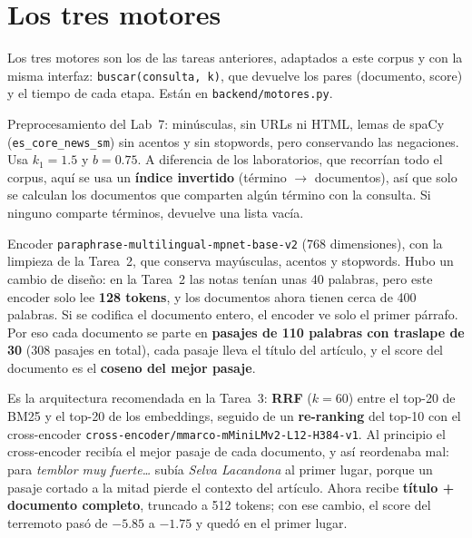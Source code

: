 \documentclass[11pt,letterpaper]{article}
\newcommand{\term}[1]{\texttt{#1}}
\begin{document}
\section{Los tres motores}

Los tres motores son los de las tareas anteriores, adaptados a este corpus y con la misma interfaz: \term{buscar(consulta, k)}, que devuelve los pares (documento, score) y el tiempo de cada etapa. Están en \term{backend/motores.py}.

\begin{description}[style=nextline]
\item[1. BM25 (Lab 3).] Preprocesamiento del Lab~7: minúsculas, sin URLs ni HTML, lemas de spaCy (\term{es\_core\_news\_sm}) sin acentos y sin stopwords, pero conservando las negaciones. Usa $k_1 = 1.5$ y $b = 0.75$. A diferencia de los laboratorios, que recorrían todo el corpus, aquí se usa un \textbf{índice invertido} (término $\to$ documentos), así que solo se calculan los documentos que comparten algún término con la consulta. Si ninguno comparte términos, devuelve una lista vacía.

\item[2. Embeddings (Tarea 2).] Encoder \term{paraphrase-multilingual-mpnet-base-v2} (768 dimensiones), con la limpieza de la Tarea~2, que conserva mayúsculas, acentos y stopwords. Hubo un cambio de diseño: en la Tarea~2 las notas tenían unas 40 palabras, pero este encoder solo lee \textbf{128 tokens}, y los documentos ahora tienen cerca de 400 palabras. Si se codifica el documento entero, el encoder ve solo el primer párrafo. Por eso cada documento se parte en \textbf{pasajes de 110 palabras con traslape de 30} (308 pasajes en total), cada pasaje lleva el título del artículo, y el score del documento es el \textbf{coseno del mejor pasaje}.

\item[3. Híbrido (Tarea 3).] Es la arquitectura recomendada en la Tarea~3: \textbf{RRF} ($k = 60$) entre el top-20 de BM25 y el top-20 de los embeddings, seguido de un \textbf{re-ranking} del top-10 con el cross-encoder \term{cross-encoder/mmarco-mMiniLMv2-L12-H384-v1}. Al principio el cross-encoder recibía el mejor pasaje de cada documento, y así reordenaba mal: para \emph{temblor muy fuerte\ldots} subía \emph{Selva Lacandona} al primer lugar, porque un pasaje cortado a la mitad pierde el contexto del artículo. Ahora recibe \textbf{título + documento completo}, truncado a 512 tokens; con ese cambio, el score del terremoto pasó de $-5.85$ a $-1.75$ y quedó en el primer lugar.
\end{description}
\end{document}
